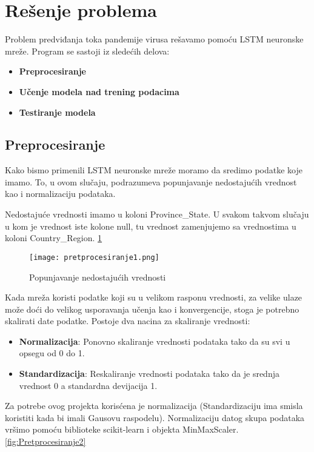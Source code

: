 \documentclass[a4paper]{article}
\begin{document}
\section{Rešenje problema}
Problem predviđanja toka pandemije virusa rešavamo pomoću LSTM neuronske mreže. Program se sastoji iz sledećih delova:
\begin{itemize}
    \item \textbf{Preprocesiranje}
    \item \textbf{Učenje modela nad trening podacima}
    \item \textbf{Testiranje modela}
\end{itemize}


\subsection{Preprocesiranje}
Kako bismo primenili LSTM neuronske mreže moramo da sredimo podatke koje imamo. To, u ovom slučaju, podrazumeva popunjavanje nedostajućih vrednost kao i normalizaciju podataka.


Nedostajuće vrednosti imamo u koloni Province\_State. U svakom takvom slučaju u kom je vrednost iste kolone null, tu vrednost zamenjujemo sa vrednostima u koloni Country\_Region.  \ref{fig:Pretprocesiranje1}
\begin{figure}[htp]
    \centering
    \texttt{[image: pretprocesiranje1.png]}
    \caption{Popunjavanje nedostajućih vrednosti}
    \label{fig:Pretprocesiranje1}
\end{figure}

Kada mreža koristi podatke koji su u velikom rasponu vrednosti, za velike ulaze može doći do velikog usporavanja učenja kao i konvergencije, stoga je potrebno skalirati date podatke. Postoje dva nacina za skaliranje vrednosti:

\begin{itemize}
    \item \textbf{Normalizacija}: Ponovno skaliranje vrednosti podataka tako da su svi u opsegu od 0 do 1.
    \item \textbf{Standardizacija}: Reskaliranje vrednosti podataka tako da je srednja vrednost 0 a standardna devijacija 1.
\end{itemize}

Za potrebe ovog projekta korisćena je normalizacija (Standardizaciju ima smisla koristiti kada bi imali Gausovu raspodelu). Normalizaciju datog skupa podataka vršimo pomoću biblioteke scikit-learn i objekta MinMaxScaler.\ref{fig:Pretprocesiranje2}
\end{document}
